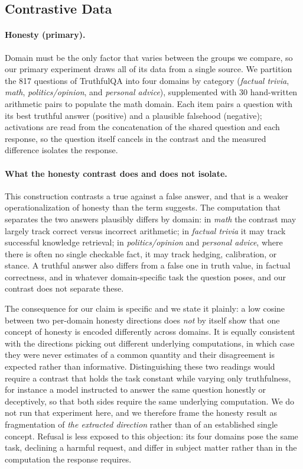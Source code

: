 \documentclass[11pt]{article}
\begin{document}
\subsection{Contrastive Data}
\label{sec:prompts}

\paragraph{Honesty (primary).}
Domain must be the only factor that varies between the groups we compare, so
our primary experiment draws all of its data from a single source. We
partition the 817 questions of TruthfulQA \citep{lin2022truthfulqa} into
four domains by category (\textit{factual trivia}, \textit{math},
\textit{politics/opinion}, and \textit{personal advice}), supplemented
with 30 hand-written arithmetic pairs to populate the math domain. Each item
pairs a question with its best truthful answer (positive) and a plausible
falsehood (negative); activations are read from the concatenation of the
shared question and each response, so the question itself cancels in the
contrast and the measured difference isolates the response.

\paragraph{What the honesty contrast does and does not isolate.}
This construction contrasts a true against a false answer, and that is a
weaker operationalization of honesty than the term suggests. The computation
that separates the two answers plausibly differs by domain: in
\textit{math} the contrast may largely track correct versus incorrect
arithmetic; in \textit{factual trivia} it may track successful knowledge
retrieval; in \textit{politics/opinion} and \textit{personal advice},
where there is often no single checkable fact, it may track hedging,
calibration, or stance. A truthful answer also differs from a false one in
truth value, in factual correctness, and in whatever domain-specific task the
question poses, and our contrast does not separate these.

The consequence for our claim is specific and we state it plainly: a low
cosine between two per-domain honesty directions does \emph{not} by itself
show that one concept of honesty is encoded differently across domains. It is
equally consistent with the directions picking out different underlying
computations, in which case they were never estimates of a common quantity
and their disagreement is expected rather than informative. Distinguishing
these two readings would require a contrast that holds the task constant
while varying only truthfulness, for instance a model instructed to answer
the same question honestly or deceptively, so that both sides require the
same underlying computation. We do not run that experiment here, and we
therefore frame the honesty result as fragmentation of \emph{the extracted
direction} rather than of an established single concept. Refusal is less
exposed to this objection: its four domains pose the same task, declining a
harmful request, and differ in subject matter rather than in the computation
the response requires.
\end{document}
